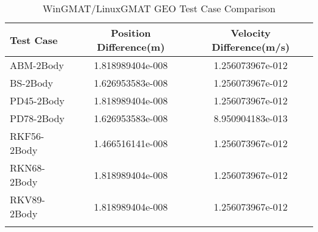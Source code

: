 \begin{table}[htbp!]
\centering
\caption{ WinGMAT/LinuxGMAT GEO Test Case Comparison}
      \begin{tabular}{lcc}
      \hline\hline
          Test Case & Position Difference(m) & Velocity Difference(m/s) \\
         \hline
         ABM-2Body & 1.818989404e-008 & 1.256073967e-012 \\
         BS-2Body & 1.626953583e-008 & 1.256073967e-012 \\
         PD45-2Body & 1.818989404e-008 & 1.256073967e-012 \\
         PD78-2Body & 1.626953583e-008 & 8.950904183e-013 \\
         RKF56-2Body & 1.466516141e-008 & 1.256073967e-012 \\
         RKN68-2Body & 1.818989404e-008 & 1.256073967e-012 \\
         RKV89-2Body & 1.818989404e-008 & 1.256073967e-012 \\
      \hline\hline
      \label{Table: GEO WinGMAT-LinuxGMAT Table} 
\end{tabular}
\end{table}
